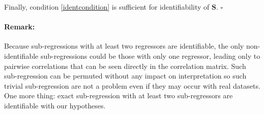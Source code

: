 \documentclass[12pt,a4paper]{report}
\begin{document}
\begin{appendices}
Finally, condition \ref{identcondition} is sufficient for identifiability of $\boldsymbol{S}$.
  	$\square$		
	
\paragraph{Remark:} Because sub-regressions with at least two regressors are identifiable, 
the only non-identifiable sub-regressions could be those with only one regressor, leading only to pairwise correlations that can be seen directly in the correlation matrix. Such sub-regression can be permuted without any impact on interpretation so such trivial sub-regression are not a problem even if they may occur with real datasets. One more thing: exact sub-regression with at least two sub-regressors are identifiable with our hypotheses. 	
	

\end{appendices}
\end{document}
